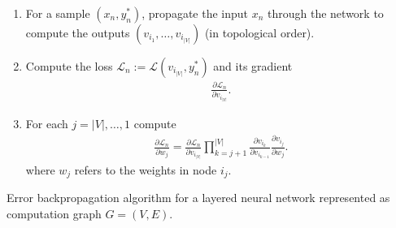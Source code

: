 \documentclass[12pt,a4paper]{article}
\begin{document}
\begin{algorithm}[h]
    \small
    \begin{enumerate}[(1)]
        \item For a sample $(x_n ,y^*_n)$, propagate the input $x_n$ through the
              network to compute the outputs $(v_{i_1}, \ldots, v_{i_{|V|}})$ (in topological order).
              \vspace{-6px}
        \item Compute the loss $\mathcal{L}_n := \mathcal{L}(v_{i_{|V|}}, y_n^*)$
              and its gradient
              \begin{align}
                  \frac{\partial \mathcal{L}_n}{\partial v_{i_{|V|}}}.
              \end{align}
              \vspace{-6px}
        \item For each $j = |V|,\ldots,1$ compute
              \begin{align}
                  \frac{\partial \mathcal{L}_n}{\partial w_j} =
                  \frac{\partial \mathcal{L}_n}{\partial v_{i_{|V|}}} \prod_{k = j + 1}^{|V|} \frac{\partial v_{i_k}}{\partial v_{i_{k - 1}}}
                  \frac{\partial v_{i_j}}{\partial w_j}.
              \end{align}
              where $w_j$ refers to the weights in node $i_j$.
              \vspace{-12px}
    \end{enumerate}
    \caption{Error backpropagation algorithm for a layered neural network
        represented as computation graph $G = (V,E)$.}
\end{algorithm}
\end{document}
